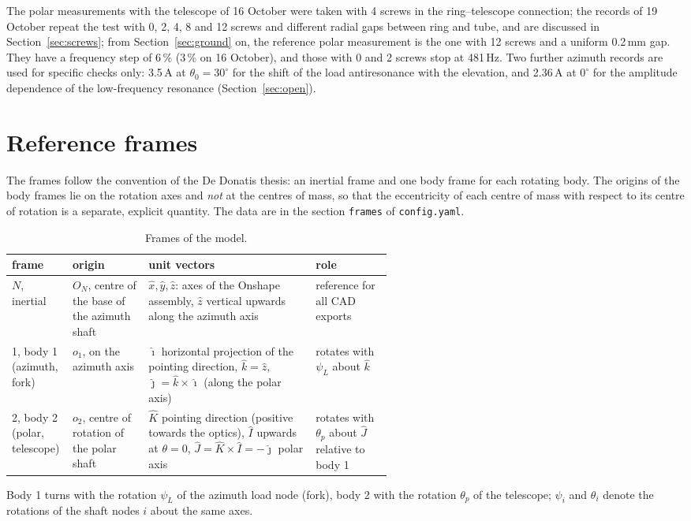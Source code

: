 \documentclass[10pt,a4paper]{article}
\numberwithin{equation}{section}
\begin{document}
The polar measurements with the telescope of 16 October were taken with 4 screws in the ring--telescope connection; the records of 19 October repeat the test with 0, 2, 4, 8 and 12 screws and different radial gaps between ring and tube, and are discussed in Section~\ref{sec:screws}; from Section~\ref{sec:ground} on, the reference polar measurement is the one with 12 screws and a uniform 0.2\,mm gap. They have a frequency step of 6\,\% (3\,\% on 16 October), and those with 0 and 2 screws stop at 481\,Hz. Two further azimuth records are used for specific checks only: 3.5\,A at $\theta_0 = 30^\circ$ for the shift of the load antiresonance with the elevation, and 2.36\,A at $0^\circ$ for the amplitude dependence of the low-frequency resonance (Section~\ref{sec:open}).

\section{Reference frames}\label{sec:frames}
The frames follow the convention of the De Donatis thesis: an inertial frame and one body frame for each rotating body. The origins of the body frames lie on the rotation axes and \emph{not} at the centres of mass, so that the eccentricity of each centre of mass with respect to its centre of rotation is a separate, explicit quantity. The data are in the section \texttt{frames} of \texttt{config.yaml}.
\begin{table}[H]\centering\small
\caption{Frames of the model.}\label{tab:frames}
\begin{tabularx}{\linewidth}{L{0.16\linewidth}L{0.2\linewidth}YL{0.2\linewidth}}\toprule
frame & origin & unit vectors & role \\ \midrule
$N$, inertial & $O_N$, centre of the base of the azimuth shaft & $\hat x, \hat y, \hat z$: axes of the Onshape assembly, $\hat z$ vertical upwards along the azimuth axis & reference for all CAD exports \\
1, body 1 (azimuth, fork) & $o_1$, on the azimuth axis & $\hat\imath$ horizontal projection of the pointing direction, $\hat k = \hat z$, $\hat\jmath = \hat k\times\hat\imath$ (along the polar axis) & rotates with $\psi_L$ about $\hat k$ \\
2, body 2 (polar, telescope) & $o_2$, centre of rotation of the polar shaft & $\hat K$ pointing direction (positive towards the optics), $\hat I$ upwards at $\theta = 0$, $\hat J = \hat K\times\hat I = -\hat\jmath$ polar axis & rotates with $\theta_p$ about $\hat J$ relative to body 1 \\ \bottomrule
\end{tabularx}\end{table}
Body 1 turns with the rotation $\psi_L$ of the azimuth load node (fork), body 2 with the rotation $\theta_p$ of the telescope; $\psi_i$ and $\theta_i$ denote the rotations of the shaft nodes $i$ about the same axes.
\end{document}
